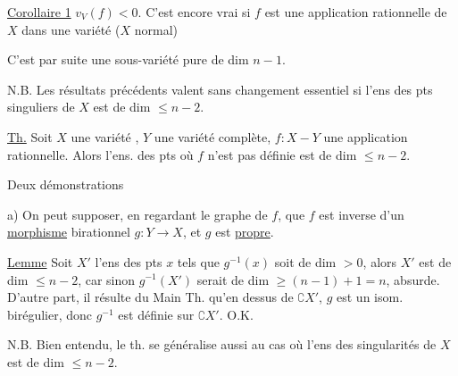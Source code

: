 \uline{Corollaire 1}   $v_V(f)<0$. C'est encore vrai si $f$ est une application rationnelle de $X$ dans une variété \uline{} ($X$ normal)

C'est par suite une sous-variété pure de dim $n-1$.

 N.B. Les résultats précédents valent sans changement essentiel si  l'ens des pts singuliers de $X$ est de dim $\leq n-2$.

\uline{Th.} Soit $X$ une variété , $Y$ une variété complète, $f:X-Y$ une application rationnelle. Alors l'ens. des pts où $f$ n'est pas définie est de dim $\leq n-2$.

Deux démonstrations

a) On peut supposer, en regardant le graphe de $f$, que $f$ est inverse d'un \uline{morphisme} birationnel $g:Y\to X$, et $g$ est  \uline{propre}.

\uline{Lemme} Soit $X'$ l'ens des pts $x$  tels que $g^{-1}(x)$ soit de dim $>0$, alors $X'$ est de dim $\leq n-2$, car sinon $g^{-1}(X')$ serait de dim $\geq(n-1)+1=n$, absurde.  D'autre part, il résulte du Main Th. qu'en dessus de $\complement X'$, $g$ est un isom. birégulier, donc $g^{-1}$ est définie sur $\complement X'$. O.K.

N.B. Bien entendu, le th. se généralise aussi au cas où l'ens des singularités de $X$ est de dim $\leq n-2$.


